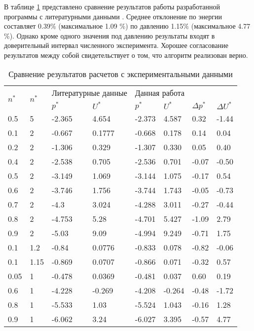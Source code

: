 В таблице \ref{tab.res} представлено сравнение результатов работы разработанной программы с литературными данными \cite{Johnson1993}. Среднее отклонение по энергии составляет 0.39\% (максимальное 1.09 \%) по давлению 1.15\% (максимальное 4.77 \%). Однако кроме одного значения под давлению результаты входят в доверительный интервал численного эксперимента. Хорошее согласование результатов между собой свидетельствует о том, что алгоритм реализован верно. 

\begin{table}[]
	\caption{Сравнение результатов расчетов с экспериментальными данными} \label{tab.res}
	\begin{tabular}{|l|l||l|l||l|l||l|l|}
		
		\hline
		\multirow{2}{*}{$n^*$} & \multirow{2}{*}{$n^*$} & \multicolumn{2}{l||}{Литературные данные} & \multicolumn{4}{l|}{Данная работа} \\ \cline{3-8}
		 & & $p^*$ & $U^*$ & $p^*$ & $U^*$ & $\Delta p^*$ &  $\Delta U^*$ \\ \hline
		0.5 & 5 & -2.365 & 4.654 & -2.373 & 4.587 & 0.32 & -1.44 \\
		0.1 & 2 & -0.667 & 0.1777 & -0.668 & 0.178 & 0.14 & 0.04 \\
		0.2 & 2 & -1.306 & 0.329 & -1.307 & 0.330 & 0.05 & 0.40 \\
		0.4 & 2 & -2.538 & 0.705 & -2.536 & 0.701 & -0.07 & -0.50 \\
		0.5 & 2 & -3.149 & 1.069 & -3.144 & 1.075 & -0.17 & 0.54 \\
		0.6 & 2 & -3.746 & 1.756 & -3.744 & 1.743 & -0.05 & -0.73 \\
		0.7 & 2 & -4.3 & 3.024 & -4.288 & 3.011 & -0.27 & -0.44 \\
		0.8 & 2 & -4.753 & 5.28 & -4.701 & 5.427 & -1.09 & 2.79 \\
		0.9 & 2 & -5.03 & 9.09 & -4.994 & 9.249 & -0.71 & 1.75 \\
		0.1 & 1.2 & -0.84 & 0.0776 & -0.833 & 0.078 & -0.82 & -0.06 \\
		0.1 & 1.15 & -0.869 & 0.0707 & -0.866 & 0.071 & -0.32 & 0.57 \\
		0.05 & 1 & -0.478 & 0.0369 & -0.481 & 0.037 & 0.60 & 0.19\\ 
		0.6 & 1 & -4.228 & -0.269 & -4.208 & -0.264 & -0.48 & -1.72\\
		0.8 & 1 & -5.533 & 1.03 & -5.524 & 1.043 & -0.16 & 1.28 \\
		0.9 & 1 & -6.062 & 3.24 & -6.027 & 3.395 & -0.57 & 4.77 \\ \hline
		
	\end{tabular}
\end{table}

